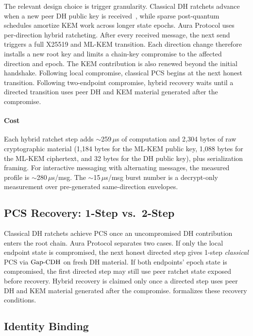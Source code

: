 \documentclass[preprint,12pt]{elsarticle}
\theoremstyle{definition}
\newcommand{\tech}[1]{\textnormal{#1}}
\newcommand{\GapCDH}{\tech{Gap-CDH}}
\begin{document}
The relevant design choice is trigger granularity. Classical DH ratchets advance
when a new peer DH public key is received~\cite{signal-double-ratchet}, while
sparse post-quantum schedules amortize KEM work across longer state epochs.
Aura Protocol uses per-direction hybrid ratcheting. After every received
message, the next send triggers a full X25519 and ML-KEM transition. Each
direction change therefore installs a new root key and limits a chain-key
compromise to the affected direction and epoch. The KEM contribution is also
renewed beyond the initial handshake. Following local compromise, classical
PCS begins at the next honest transition. Following two-endpoint compromise,
hybrid recovery waits until a directed transition uses peer DH and KEM material
generated after the compromise.

\paragraph{Cost}
Each hybrid ratchet step adds $\sim$259\,$\mu$s of computation and 2{,}304 bytes of raw cryptographic material (1{,}184 bytes for the ML-KEM public key, 1{,}088 bytes for the ML-KEM ciphertext, and 32 bytes for the DH public key), plus serialization framing. For interactive messaging with alternating messages, the measured profile is $\sim$280\,$\mu$s/msg. The $\sim$15\,$\mu$s/msg burst number is a decrypt-only measurement over pre-generated same-direction envelopes.

\subsection{PCS Recovery: 1-Step vs.\ 2-Step}

Classical DH ratchets achieve PCS once an uncompromised DH contribution
enters the root chain. Aura Protocol separates two cases. If only the local endpoint
state is compromised, the next honest directed step gives 1-step
\emph{classical} PCS via $\GapCDH$ on fresh DH material. If both endpoints'
epoch state is compromised, the first directed step may still use peer
ratchet state exposed before recovery. Hybrid recovery is claimed only once a
directed step uses peer DH and KEM material generated after the compromise.
 formalizes these recovery conditions.

\subsection{Identity Binding}
\end{document}
